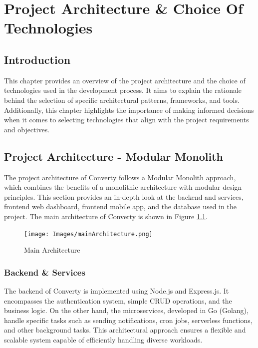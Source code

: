 \chapter{Project Architecture \& Choice Of Technologies}
\setcounter{minitocdepth}{1}
\minitoc
\newpage

\section{Introduction}
This chapter provides an overview of the project architecture and the choice of technologies used in the development process. It aims to explain the rationale behind the selection of specific architectural patterns, frameworks, and tools. Additionally, this chapter highlights the importance of making informed decisions when it comes to selecting technologies that align with the project requirements and objectives.

\section{Project Architecture - Modular Monolith}
The project architecture of Converty follows a Modular Monolith approach, which combines the benefits of a monolithic architecture with modular design principles. This section provides an in-depth look at the backend and services, frontend web dashboard, frontend mobile app, and the database used in the project.
The main architecture of Converty is shown in Figure \ref{fig:mainArchitecture}.

\begin{figure}[H]
    \centering
    \texttt{[image: Images/mainArchitecture.png]}
    \caption{Main Architecture}
    \label{fig:mainArchitecture}
\end{figure}

\subsection{Backend \& Services}
The backend of Converty is implemented using Node.js and Express.js. It encompasses the authentication system, simple CRUD operations, and the business logic. On the other hand, the microservices, developed in Go (Golang), handle specific tasks such as sending notifications, cron jobs, serverless functions, and other background tasks. This architectural approach ensures a flexible and scalable system capable of efficiently handling diverse workloads.

